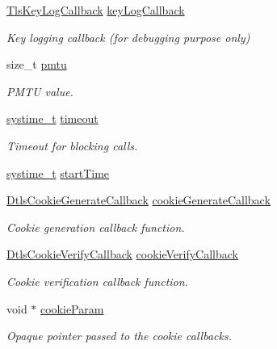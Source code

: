\begin{DoxyCompactItemize}
\hyperlink{tls_8h_a562fd539fc11782835f2692e3dcaf5b1}{Tls\+Key\+Log\+Callback} \hyperlink{struct__TlsContext_a9785cb9de496cd322a403f5485313a40}{key\+Log\+Callback}
\begin{DoxyCompactList}\small\item\em Key logging callback (for debugging purpose only) \end{DoxyCompactList}\item 
size\+\_\+t \hyperlink{struct__TlsContext_a08e3d48a5375ee7989a211cda75a8258}{pmtu}
\begin{DoxyCompactList}\small\item\em P\+M\+TU value. \end{DoxyCompactList}\item 
\hyperlink{compiler__port_8h_ae3e32a98d431a02106616da3071832dd}{systime\+\_\+t} \hyperlink{struct__TlsContext_a1a8c648700a280a6b692bb4d03277456}{timeout}
\begin{DoxyCompactList}\small\item\em Timeout for blocking calls. \end{DoxyCompactList}\item 
\hyperlink{compiler__port_8h_ae3e32a98d431a02106616da3071832dd}{systime\+\_\+t} \hyperlink{struct__TlsContext_af85f4521169c854562c70c1ee9f10144}{start\+Time}
\item 
\hyperlink{dtls__misc_8h_a26c71101670183fb3f3a89aa3084800d}{Dtls\+Cookie\+Generate\+Callback} \hyperlink{struct__TlsContext_a10acb70ff4325977104220fbe5406270}{cookie\+Generate\+Callback}
\begin{DoxyCompactList}\small\item\em Cookie generation callback function. \end{DoxyCompactList}\item 
\hyperlink{dtls__misc_8h_ad815ff6a1d5fa9f07fde4475168c6538}{Dtls\+Cookie\+Verify\+Callback} \hyperlink{struct__TlsContext_a5e2fc5800b052286bd151bee2850c5e8}{cookie\+Verify\+Callback}
\begin{DoxyCompactList}\small\item\em Cookie verification callback function. \end{DoxyCompactList}\item 
void $\ast$ \hyperlink{struct__TlsContext_aff208350d3c85b84a63b542b4a5dc057}{cookie\+Param}
\begin{DoxyCompactList}\small\item\em Opaque pointer passed to the cookie callbacks. \end{DoxyCompactList}\item 

\end{DoxyCompactItemize}
